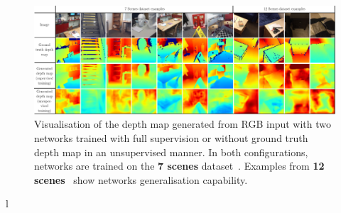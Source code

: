 \begin{landscape}
\begin{figure}
    \centering
    
	\includegraphics[width=\linewidth]{results/indoor/depth_maps}
	\caption[Generated indoor depth maps]{\label{fig:depth_map_indoor} Visualisation of the depth map generated from RGB input with two networks trained with full supervision or without ground truth depth map in an unsupervised manner. In both configurations, networks are trained on the \textbf{7 scenes} dataset~\citep{Shotton2013}. Examples from \textbf{12 scenes}~\citep{Valentin2016} show networks generalisation capability.}

\end{figure}l
\end{landscape}
